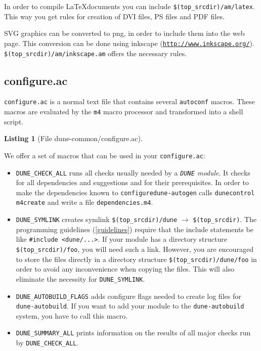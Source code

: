 \documentclass[11pt,a4paper,headinclude,footinclude,DIV16,normalheadings]{scrartcl}
\newtheorem{lst}{Listing}
\newcommand{\dune}{\texttt{DUNE}\xspace}
\newcommand{\autoconf}{\texttt{autoconf}\xspace}
\newcommand{\autogen}{\texttt{dune-autogen}\xspace}
\newcommand{\configure}{\texttt{configure}\xspace}
\newcommand{\configureac}{\texttt{configure.ac}\xspace}
\newcommand{\topsrc}{\$(top\_srcdir)}
\begin{document}
In order to compile \LaTeX documents you can include
\texttt{\$(top\_srcdir)/am/latex}. This way you get rules for creation
of DVI files, PS files and PDF files.

SVG graphics can be converted to png, in order to include them into
the web page. This conversion can be done using inkscape
(\texttt{\url{http://www.inkscape.org/}}).
\texttt{\$(top\_srcdir)/am/inkscape.am} offers the necessary rules.


\subsection{configure.ac}
\label{configure.ac}

\configureac  is a normal text file that contains several \autoconf
macros. These macros are evaluated by the \texttt{m4} macro processor
and transformed into a shell script.

\begin{lst}[File dune-common/configure.ac] \mbox{}

\end{lst}

We offer a set of macros that can be used in your \configureac:

\begin{itemize}
\item \texttt{DUNE\_CHECK\_ALL}
  runs all checks usually needed by a {\em \dune module}.
  It checks for all dependencies and suggestions and for their
  prerequisites.
  In order to make the dependencies known to \configure \autogen calls
  \texttt{dunecontrol m4create} and write a file
  \texttt{dependencies.m4}.
\item \texttt{DUNE\_SYMLINK}
  creates symlink \texttt{\$(top\_srcdir)/dune} $\rightarrow$
  \texttt{\$(top\_srcdir)}. The programming guidelines (\ref{guidelines})
  require that the include statements be like \texttt{\#include
    <dune/...>}. If your module has a directory structure
  \texttt{\topsrc/foo}, you will need such a link. However, you are
  encouraged to store the files directly in a directory structure
  \texttt{\topsrc/dune/foo} in order to avoid any inconvenience when
  copying the files. This will also eliminate the necessity for
  \texttt{DUNE\_SYMLINK}.
\item \texttt{DUNE\_AUTOBUILD\_FLAGS}
  adds configure flags needed to create log files for
  \texttt{dune-autobuild}. If you want to add your module to the
  \texttt{dune-autobuild} system, you have to call this macro.
\item \texttt{DUNE\_SUMMARY\_ALL}
  prints information on the results of all major checks run by
  \texttt{DUNE\_CHECK\_ALL}.
\end{itemize}
\end{document}
